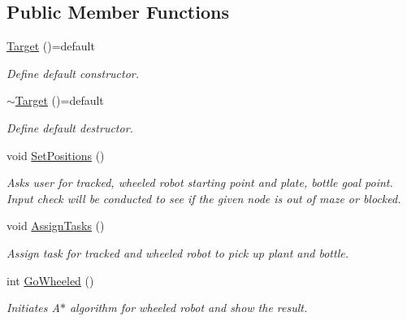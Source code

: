 \subsection*{Public Member Functions}
\begin{DoxyCompactItemize}
\item 
\mbox{\label{class_target_ace5b2cdf7653114127fe251b60a21315}} 
\mbox{\hyperlink{class_target_ace5b2cdf7653114127fe251b60a21315}{Target}} ()=default
\begin{DoxyCompactList}\small\item\em Define default constructor. \end{DoxyCompactList}\item 
\mbox{\label{class_target_a060fe6f86a639f3494f4f3e8c9ffe2dc}} 
\mbox{\hyperlink{class_target_a060fe6f86a639f3494f4f3e8c9ffe2dc}{$\sim$\+Target}} ()=default
\begin{DoxyCompactList}\small\item\em Define default destructor. \end{DoxyCompactList}\item 
\mbox{\label{class_target_a103b036c289d88d0bf64b8ba53a107a4}} 
void \mbox{\hyperlink{class_target_a103b036c289d88d0bf64b8ba53a107a4}{Set\+Positions}} ()
\begin{DoxyCompactList}\small\item\em Asks user for tracked, wheeled robot starting point and plate, bottle goal point. Input check will be conducted to see if the given node is out of maze or blocked. \end{DoxyCompactList}\item 
\mbox{\label{class_target_aa6bf223ceb194b7eeea72f15afd0393f}} 
void \mbox{\hyperlink{class_target_aa6bf223ceb194b7eeea72f15afd0393f}{Assign\+Tasks}} ()
\begin{DoxyCompactList}\small\item\em Assign task for tracked and wheeled robot to pick up plant and bottle. \end{DoxyCompactList}\item 
\mbox{\label{class_target_a35aed209d4dd1dadcc899bf76793baa3}} 
int \mbox{\hyperlink{class_target_a35aed209d4dd1dadcc899bf76793baa3}{Go\+Wheeled}} ()
\begin{DoxyCompactList}\small\item\em Initiates A$\ast$ algorithm for wheeled robot and show the result. \end{DoxyCompactList}\item 

\end{DoxyCompactItemize}
